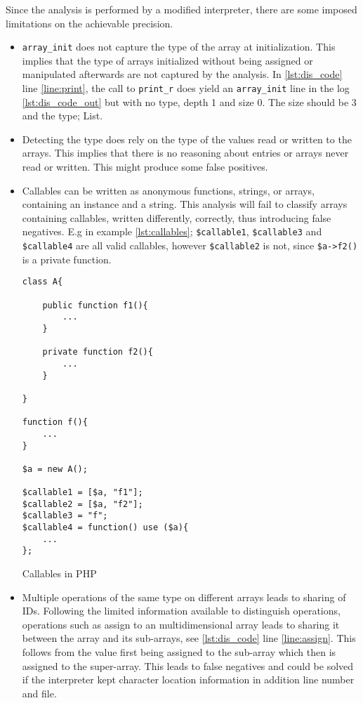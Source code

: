 Since the analysis is performed by a modified interpreter, there are some imposed limitations on the achievable precision. 

\begin{itemize}
\item  \texttt{array\_init} does not capture the type of the array at initialization. This implies that the type of arrays initialized without being assigned or manipulated afterwards are not captured by the analysis. In \ref{lst:dis_code} line \ref{line:print}, the call to \texttt{print\_r} does yield an \texttt{array\_init} line in the log \ref{lst:dis_code_out} but with no type, depth 1 and size 0. The size should be 3 and the type; List.

\item Detecting the type does rely on the type of the values read or written to the arrays. This implies that there is no reasoning about entries or arrays never read or written. This might produce some false positives.

\item Callables can be written as anonymous functions, strings, or arrays, containing an instance and a string. This analysis will fail to classify arrays containing callables, written differently, correctly, thus introducing false negatives. E.g in example \ref{lst:callables}; \texttt{\$callable1}, \texttt{\$callable3} and \texttt{\$callable4} are all valid callables, however \texttt{\$callable2} is not, since \texttt{\$a->f2()} is a private function.

\begin{program}
\centering
\begin{lstlisting}
class A{

    public function f1(){
        ...
    }

    private function f2(){
        ...
    }

}

function f(){
    ...
}

$a = new A();

$callable1 = [$a, "f1"];
$callable2 = [$a, "f2"];
$callable3 = "f";
$callable4 = function() use ($a){
    ...
};
\end{lstlisting}
\caption{Callables in PHP}
\label{lst:callables}
\end{program}

\item Multiple operations of the same type on different arrays leads to sharing of IDs. Following the limited information available to distinguish operations, operations such as assign to an multidimensional array leads to sharing it between the array and its sub-arrays, see \ref{lst:dis_code} line \ref{line:assign}. This follows from the value first being assigned to the sub-array which then is assigned to the super-array. This leads to false negatives and could be solved if the interpreter kept character location information in addition line number and file.   

\end{itemize}




